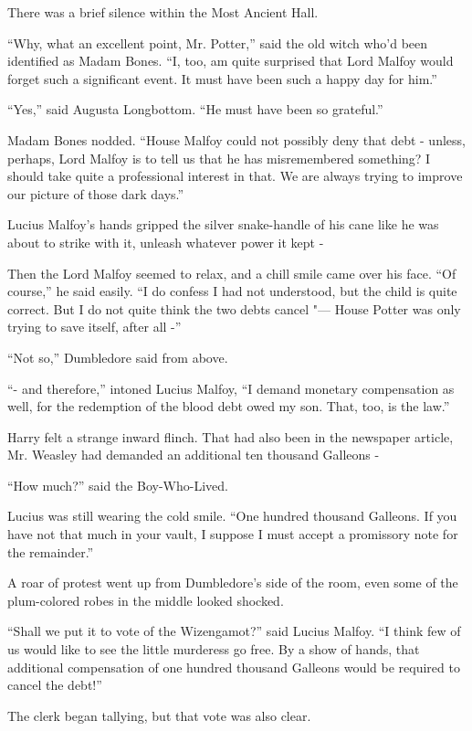 There was a brief silence within the Most Ancient Hall.

``Why, what an excellent point, Mr. Potter,'' said the old witch who'd
been identified as Madam Bones. ``I, too, am quite surprised that Lord
Malfoy would forget such a significant event. It must have been such a
happy day for him.''

``Yes,'' said Augusta Longbottom. ``He must have been so grateful.''

Madam Bones nodded. ``House Malfoy could not possibly deny that debt -
unless, perhaps, Lord Malfoy is to tell us that he has misremembered
something? I should take quite a professional interest in that. We are
always trying to improve our picture of those dark days.''

Lucius Malfoy's hands gripped the silver snake-handle of his cane like
he was about to strike with it, unleash whatever power it kept -

Then the Lord Malfoy seemed to relax, and a chill smile came over his
face. ``Of course,'' he said easily. ``I do confess I had not
understood, but the child is quite correct. But I do not quite think the
two debts cancel "--- House Potter was only trying to save itself, after
all -''

``Not so,'' Dumbledore said from above.

``- and therefore,'' intoned Lucius Malfoy, ``I demand monetary
compensation as well, for the redemption of the blood debt owed my son.
That, too, is the law.''

Harry felt a strange inward flinch. That had also been in the newspaper
article, Mr. Weasley had demanded an additional ten thousand Galleons -

``How much?'' said the Boy-Who-Lived.

Lucius was still wearing the cold smile. ``One hundred thousand
Galleons. If you have not that much in your vault, I suppose I must
accept a promissory note for the remainder.''

A roar of protest went up from Dumbledore's side of the room, even some
of the plum-colored robes in the middle looked shocked.

``Shall we put it to vote of the Wizengamot?'' said Lucius Malfoy. ``I
think few of us would like to see the little murderess go free. By a
show of hands, that additional compensation of one hundred thousand
Galleons would be required to cancel the debt!''

The clerk began tallying, but that vote was also clear.

